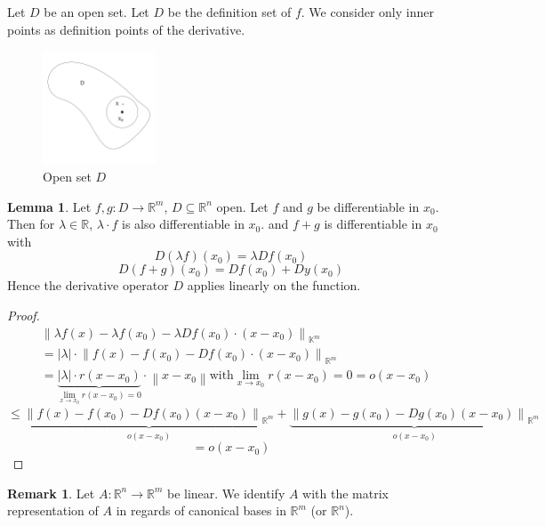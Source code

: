 \documentclass[a4paper,landscape,twocolumn]{article}
\theoremstyle{definition}
\newtheorem{rem}{Remark}
\newtheorem{lemma}{Lemma}
\newcommand\abs[1]{\left|#1\right|}
\newcommand\norm[1]{\left\|#1\right\|}
\begin{document}
Let $D$ be an open set. Let $D$ be the definition set of $f$.
We consider only inner points as definition points of the derivative.

\begin{figure}[!h]
  \begin{center}
    \includegraphics[width=0.3\textwidth]{img/D.pdf}
    \caption{Open set $D$}
  \end{center}
\end{figure}

\begin{lemma}
  Let $f, g: D \to \mathbb R^m$, $D \subseteq \mathbb R^n$ open.
  Let $f$ and $g$ be differentiable in $x_0$.
  Then for $\lambda \in \mathbb R$, $\lambda \cdot f$ is also differentiable in $x_0$.
  and $f + g$ is differentiable in $x_0$ with
  \[ D(\lambda f) (x_0) = \lambda Df(x_0) \]
  \[ D(f + g)(x_0) = Df(x_0) + Dy(x_0) \]
  Hence the derivative operator $D$ applies linearly on the function.
\end{lemma}
\begin{proof}
  \begin{align*}
    &\norm{\lambda f(x) - \lambda f(x_0) - \lambda Df(x_0) \cdot (x - x_0)}_{\mathbb K^m} \\
    &= \abs{\lambda} \cdot \norm{f(x) - f(x_0) - Df(x_0) \cdot (x - x_0)}_{\mathbb R^m} \\
    &= \underbrace{\abs{\lambda} \cdot r(x - x_0)}_{\lim_{x\to x_0} r(x- x_0) = 0} \cdot \norm{x - x_0} \text{with} \lim_{x\to x_0} r(x - x_0) = 0 = o(x - x_0)
  \end{align*}
  \[
  \leq \underbrace{\norm{f(x) - f(x_0) - Df(x_0) (x - x_0)}_{\mathbb R^m}}_{o(x - x_0)} +
  \underbrace{\norm{g(x) - g(x_0) - Dg(x_0) (x - x_0)}_{\mathbb R^m}}_{o(x - x_0)}
  \] \[
  = o(x - x_0)
  \]
\end{proof}

\begin{rem}
  Let $A: \mathbb R^n \to \mathbb R^m$ be linear.
  We identify $A$ with the matrix representation of $A$ in regards of canonical bases in $\mathbb R^m$
  (or $\mathbb R^n$).
\end{rem}
\end{document}
